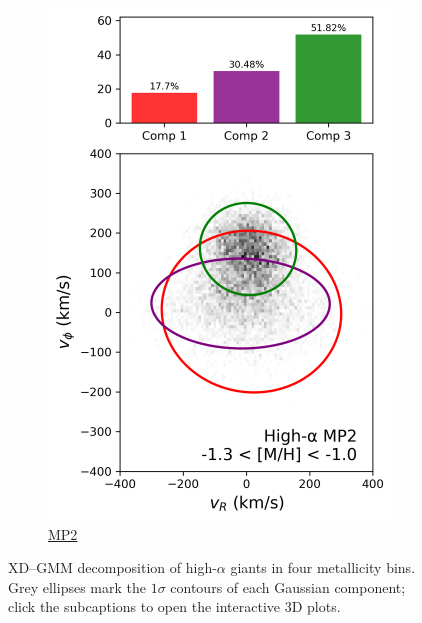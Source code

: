 \documentclass[a4paper,12pt]{article}
\begin{document}
\begin{figure}[H]
\begin{subfigure}{0.245\linewidth}
    \includegraphics[width=\linewidth]{../figures/gmm_mp2_high_alpha_k6.png}
    \caption{\href{https://raw.githack.com/raunaq-rai/Disentangling-the-Milky-Way-using-GMM/main/figures/MP2\_high\_\_\_-1.3\%5BM\_H\%5D-1.0.html}{MP2}}
    \label{fig:mp2_hi}
  \end{subfigure}

  \caption{XD–GMM decomposition of high-$\alpha$ giants in four metallicity bins. Grey ellipses mark the $1\sigma$ contours of each Gaussian component; click the subcaptions to open the interactive 3D plots.}
  \label{fig:gmm_4wide_hi}
\end{figure}
\end{document}

